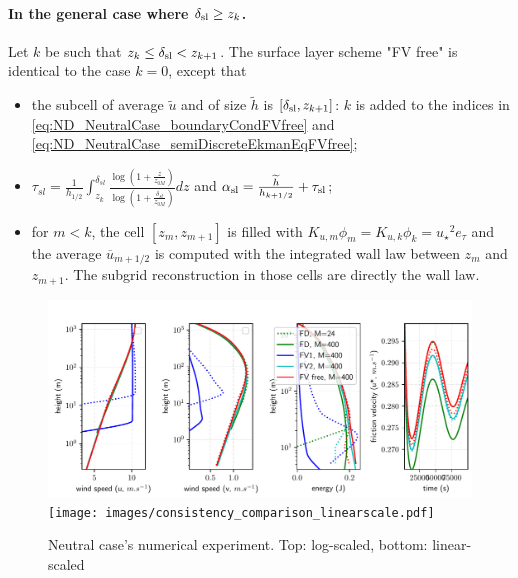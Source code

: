 \paragraph{In the general case where $\delta_{\rm sl} \geq z_k$.}
Let $k$ be such that $z_k \leq \delta_{\rm sl} < z_{k+1}$.
The surface layer scheme "FV free" is identical to the case $k=0$, except that
\begin{itemize}
	\item the subcell of average $\widetilde{u}$ and of size
		$\widetilde{h}$ is $[\delta_{\rm sl}, z_{k+1}]$:
		$k$ is added to the indices in 
		\eqref{eq:ND_NeutralCase_boundaryCondFVfree} and
		\eqref{eq:ND_NeutralCase_semiDiscreteEkmanEqFVfree};
	\item $\tau_{sl} = \frac{1}{{h_{1/2}}}\int_{z_k}^{\delta_{sl}} \frac{\log(1+\frac{z}{z_{0M}})}{\log(1+\frac{\delta_{sl}}{z_{0M}})} dz$ and $\alpha_{\rm sl} = \frac{\widetilde{h}}{h_{k+1/2}} + \tau_{\rm sl}$;
	\item for $m < k$, the cell $[z_m, z_{m+1}]$ is filled with
		$K_{u,m} \phi_m = K_{u,k}\phi_k =
	{u_\star}^2e_\tau$
		and the average $\overline{u}_{m+1/2}$
		is computed with the integrated wall law
		between $z_m$ and $z_{m+1}$.
		The subgrid reconstruction in those cells are directly
		the wall law.
\end{itemize}
\begin{figure}
	\centering
	\includegraphics[scale=0.55]{images/consistency_comparison.pdf}
	\texttt{[image: images/consistency\_comparison\_linearscale.pdf]}
	\caption{Neutral case's numerical experiment. Top: log-scaled, bottom: linear-scaled}
	\label{fig:ND_NeutralCase_NumericalExp}
\end{figure}
